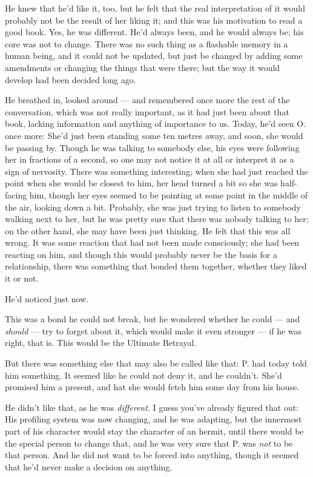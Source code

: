 He knew that he'd like it, too, but he felt that the real interpretation of it would probably not be the result of her liking it; and this was his motivation to read a good book. 
Yes, he was different. He'd always been, and he would always be; his core was not to change. There was no such thing as a flashable memory in a human being, and it could not be updated, but just be changed by adding some amendments or changing the things that were there; but the way it would develop had been decided long ago.

He breathed in, looked around --- and remembered once more the rest of the conversation, which was not really important, as it had just been about that book, lacking information and anything of importance to us. Today, he'd seen O. once more: She'd just been standing some ten metres away, and soon, she would be passing by. Though he was talking to somebody else, his eyes were following her in fractions of a second, so one may not notice it at all or interpret it as a sign of nervosity. There was something interesting; when she had just reached the point when she would be closest to him, her head turned a bit so she was half-facing him, though her eyes seemed to be pointing at some point in the middle of the air, looking down a bit. Probably, she was just trying to listen to somebody walking next to her, but he was pretty sure that there was nobody talking to her; on the other hand, she may have been just thinking. He felt that this was all wrong. It was some reaction that had not been made consciously; she had been reacting on him, and though this would probably never be the basis for a relationship, there was something that bonded them together, whether they liked it or not.

He'd noticed just now.

This was a bond he could not break, but he wondered whether he could --- and \emph{should} --- try to forget about it, which would make it even stronger --- if he was right, that is.
This would be the Ultimate Betrayal.

But there was something else that may also be called like that: P. had today told him something. It seemed like he could not deny it, and he couldn't. She'd promised him a present, and hat she would fetch him some day from his house.

He didn't like that, as he was \emph{different}. I guess you've already figured that out: His profiling system was now changing, and he was adapting, but the innermost part of his character would stay the character of an hermit, until there would be the special person to change that, and he was very sure that P. was \emph{not} to be that person. And he did not want to be forced into anything, though it seemed that he'd never make a decision on anything.

